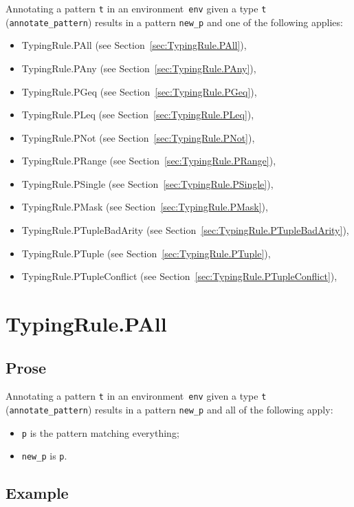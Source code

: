 \documentclass{book}
\begin{document}
\begin{itemize}
Annotating a pattern \texttt{t} in an environment~\texttt{env} given a type \texttt{t} (\texttt{annotate\_pattern}) results in a pattern \texttt{new\_p} and one of the following applies:
\begin{itemize}
\item TypingRule.PAll (see Section~\ref{sec:TypingRule.PAll}),
\item TypingRule.PAny (see Section~\ref{sec:TypingRule.PAny}),
\item TypingRule.PGeq (see Section~\ref{sec:TypingRule.PGeq}),
\item TypingRule.PLeq (see Section~\ref{sec:TypingRule.PLeq}),
\item TypingRule.PNot (see Section~\ref{sec:TypingRule.PNot}),
\item TypingRule.PRange (see Section~\ref{sec:TypingRule.PRange}),
\item TypingRule.PSingle (see Section~\ref{sec:TypingRule.PSingle}),
\item TypingRule.PMask (see Section~\ref{sec:TypingRule.PMask}),
\item TypingRule.PTupleBadArity (see Section~\ref{sec:TypingRule.PTupleBadArity}),
\item TypingRule.PTuple (see Section~\ref{sec:TypingRule.PTuple}),
\item TypingRule.PTupleConflict (see Section~\ref{sec:TypingRule.PTupleConflict}),
\end{itemize}

\section{TypingRule.PAll \label{sec:TypingRule.PAll}}

  \subsection{Prose}
   Annotating a pattern \texttt{t} in an environment~\texttt{env} given a type \texttt{t} (\texttt{annotate\_pattern}) results in a pattern \texttt{new\_p} and all of the following apply:
   \begin{itemize}
   \item \texttt{p} is the pattern matching everything;
   \item \texttt{new\_p} is \texttt{p}.
   \end{itemize}

  \subsection{Example}



\end{itemize}
\end{document}
